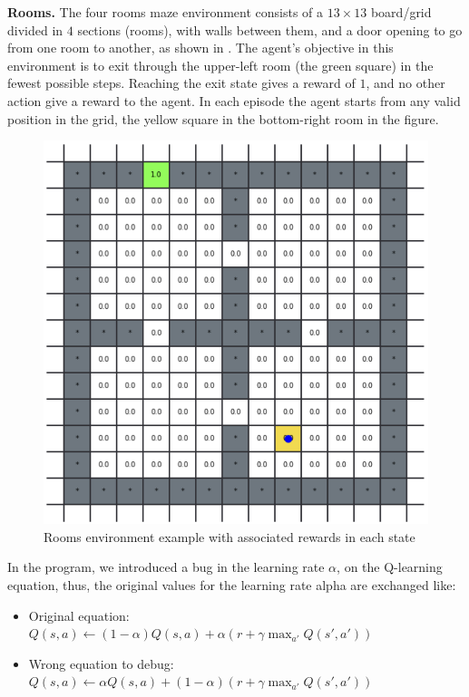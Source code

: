 
\textbf{Rooms.} The four rooms maze environment consists of a $13\times 13$ board/grid divided in $4$ sections 
(\ie rooms), with walls between them, and a door opening to go from one room to another, as shown 
in . The agent's objective in this environment is to exit through the upper-left room 
(the green square) in the fewest possible steps. Reaching the exit state gives a reward of $1$, and no 
other action give a reward to the agent. In each episode the agent starts from any valid position in the 
grid, \eg the yellow square in the bottom-right room in the figure. 

\begin{figure}[h]
  \centering
  \includegraphics[width=0.5\columnwidth]{figures/rooms.png}
  \caption{Rooms environment example with associated rewards in each state}
  \label{fig:rooms}
\end{figure}

In the program, we introduced a bug in the learning rate $\alpha$, on the Q-learning equation, thus,  the original values for the learning rate alpha are exchanged like:

\begin{itemize}
\item Original equation:
$
Q(s, a) \leftarrow (1-\alpha) Q(s, a) + \alpha \left( r + \gamma \max_{a'} Q(s', a') \right)
$

\item Wrong equation to debug:
$
Q(s, a) \leftarrow  \alpha Q(s, a) + (1-\alpha) \left( r + \gamma \max_{a'} Q(s', a') \right)
$
\end{itemize}

